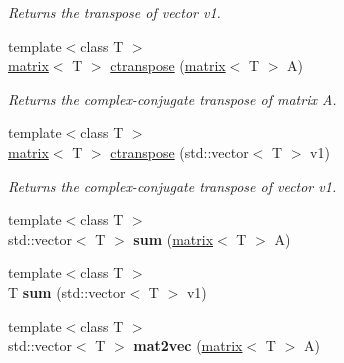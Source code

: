 \begin{DoxyCompactItemize}
\begin{DoxyCompactList}\small\item\em Returns the transpose of vector v1. \end{DoxyCompactList}\item 
\hypertarget{namespacekeycpp_a88081df8038d0b630d6a3540aeca8b9a}{{\footnotesize template$<$class T $>$ }\\\hyperlink{classkeycpp_1_1matrix}{matrix}$<$ T $>$ \hyperlink{namespacekeycpp_a88081df8038d0b630d6a3540aeca8b9a}{ctranspose} (\hyperlink{classkeycpp_1_1matrix}{matrix}$<$ T $>$ A)}\label{namespacekeycpp_a88081df8038d0b630d6a3540aeca8b9a}

\begin{DoxyCompactList}\small\item\em Returns the complex-\/conjugate transpose of matrix A. \end{DoxyCompactList}\item 
\hypertarget{namespacekeycpp_a827218d19d98cf1357032a652a9bf4e5}{{\footnotesize template$<$class T $>$ }\\\hyperlink{classkeycpp_1_1matrix}{matrix}$<$ T $>$ \hyperlink{namespacekeycpp_a827218d19d98cf1357032a652a9bf4e5}{ctranspose} (std\-::vector$<$ T $>$ v1)}\label{namespacekeycpp_a827218d19d98cf1357032a652a9bf4e5}

\begin{DoxyCompactList}\small\item\em Returns the complex-\/conjugate transpose of vector v1. \end{DoxyCompactList}\item 
\hypertarget{namespacekeycpp_a4aedb589e76ced5d79d62c5f72029adb}{{\footnotesize template$<$class T $>$ }\\std\-::vector$<$ T $>$ {\bfseries sum} (\hyperlink{classkeycpp_1_1matrix}{matrix}$<$ T $>$ A)}\label{namespacekeycpp_a4aedb589e76ced5d79d62c5f72029adb}

\item 
\hypertarget{namespacekeycpp_ad05b888638b5ea7103bdc6ba0882d47d}{{\footnotesize template$<$class T $>$ }\\T {\bfseries sum} (std\-::vector$<$ T $>$ v1)}\label{namespacekeycpp_ad05b888638b5ea7103bdc6ba0882d47d}

\item 
\hypertarget{namespacekeycpp_a8a0e8201f775945a0a61d6d645a3456e}{{\footnotesize template$<$class T $>$ }\\std\-::vector$<$ T $>$ {\bfseries mat2vec} (\hyperlink{classkeycpp_1_1matrix}{matrix}$<$ T $>$ A)}\label{namespacekeycpp_a8a0e8201f775945a0a61d6d645a3456e}


\end{DoxyCompactItemize}
